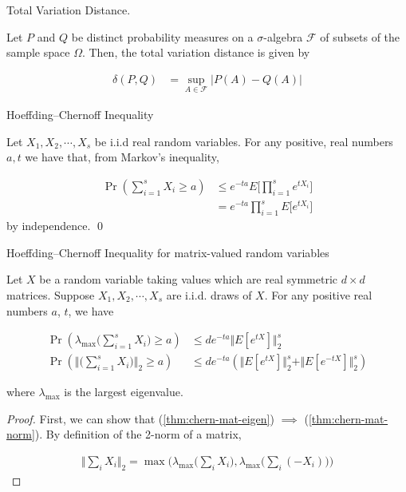\documentclass[main.tex]{subfiles}
\begin{document}
\begin{subappendices}
\begin{definition} Total Variation Distance.
\label{def:tve}

Let $P$ and $Q$ be distinct probability measures on a $\sigma$-algebra $\mathcal{F}$ of subsets of the sample space $\Omega$. Then, the total variation distance is given by

\begin{align*}
\delta(P, Q) &= \sup_{A \in \mathcal{F}}\vert P(A) - Q(A)\vert
\end{align*}
\end{definition}

\begin{lemma}Hoeffding--Chernoff Inequality
\label{lem:chernoff}

Let $X_1, X_2, \cdots, X_s$	be i.i.d real random variables. For any positive, real numbers $a, t$ we have that, from Markov's inequality,

\begin{align*}
\Pr(\sum_{i=1}^s X_i \geq a) &\leq e^{-ta} E\Bigg[\prod_{i=1}^s e^{tX_i}\Bigg]\\
&= e^{-ta} \prod_{i=1}^s E\Bigg[e^{tX_i}\Bigg]
\end{align*}
by independence.
\qed
\end{lemma}

\begin{theorem}Hoeffding--Chernoff Inequality for matrix-valued random variables \cite{kannan2017randomized}
	
	Let $X$ be a random variable taking values which are real symmetric $d \times d$ matrices. Suppose $X_1, X_2, \cdots , X_s$ are i.i.d. draws of $X$. For any positive real numbers $a$, $t$, we have
	
	\begin{align}
		\label{thm:chern-mat-eigen}
		\Pr(\lambda_{\max}\Big(\sum_{i=1}^s X_i\Big) \geq a ) &\leq de^{-ta} \Vert E[e^{tX}]\Vert_2^s \\
		\label{thm:chern-mat-norm}
		\Pr(\Big\Vert \Big(\sum_{i=1}^s X_i\Big)\Big\Vert_2 \geq a ) &\leq de^{-ta} (\Vert E[e^{tX}]\Vert_2^s + \Vert E[e^{-tX}]\Vert_2^s)
	\end{align}
	
	where $\lambda_{\max}$ is the largest eigenvalue.
	\begin{proof}
		First, we can show that (\ref{thm:chern-mat-eigen}) $\implies$ (\ref{thm:chern-mat-norm}). By definition of the 2-norm of a matrix,
		
		\begin{align*}
		\Vert \sum_i X_i \Vert_2 = \max\Big(\lambda_{\max} \Big(\sum_i X_i\Big), \lambda_{\max} \Big(\sum_i (-X_i)\Big)\Big)	
		\end{align*}
		

\end{proof}
\end{theorem}
\end{subappendices}
\end{document}
